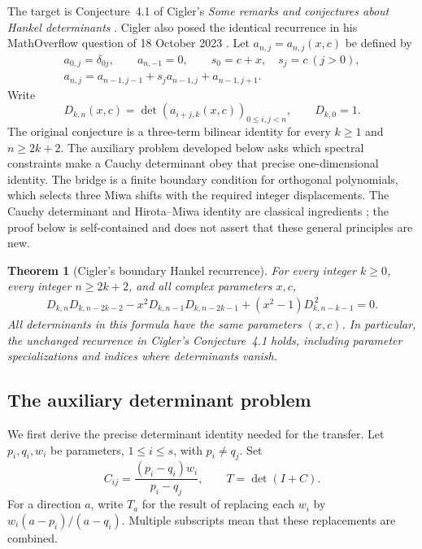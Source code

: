 \documentclass[11pt,a4paper]{article}
\newtheorem{theorem}{Theorem}[section]
\theoremstyle{definition}\newtheorem{definition}[theorem]{Definition}
\theoremstyle{remark}\newtheorem{remark}[theorem]{Remark}
\begin{document}
The target is Conjecture~4.1 of Cigler's
\emph{Some remarks and conjectures about Hankel determinants}
\cite{CiglerRemarks}. Cigler also posed the identical recurrence in his
MathOverflow question of 18 October 2023 \cite{CiglerMO23}.
Let $a_{n,j}=a_{n,j}(x,c)$ be defined by
\begin{gather*}
 a_{0,j}=\delta_{0j},\qquad a_{n,-1}=0,\qquad
 s_0=c+x,\quad s_j=c\ (j>0),\\
 a_{n,j}=a_{n-1,j-1}+s_j a_{n-1,j}+a_{n-1,j+1}.
\end{gather*}
Write
\[
 D_{k,n}(x,c)=\det(a_{i+j,k}(x,c))_{0\leq i,j<n},
 \qquad D_{k,0}=1.
\]
The original conjecture is a three-term bilinear identity for every
$k\geq1$ and $n\geq2k+2$. The auxiliary problem developed below asks
which spectral constraints make a Cauchy determinant obey that precise
one-dimensional identity. The bridge is a finite boundary condition for
orthogonal polynomials, which selects three Miwa shifts with the required
integer displacements. The Cauchy determinant and Hirota--Miwa identity
are classical ingredients \cite{OhtaHirotaTsujimotoImai93}; the proof below
is self-contained and does not assert that these general principles are new.

\begin{theorem}[Cigler's boundary Hankel recurrence]
\label{thm:cigler-boundary}
For every integer $k\geq0$, every integer $n\geq2k+2$, and all complex
parameters $x,c$,
\begin{align}
 D_{k,n}D_{k,n-2k-2}
 -x^2D_{k,n-1}D_{k,n-2k-1}
 +(x^2-1)D_{k,n-k-1}^{\,2}=0.
 \label{eq:cigler-target}
\end{align}
All determinants in this formula have the same parameters $(x,c)$.
In particular, the unchanged recurrence in Cigler's Conjecture~4.1 holds,
including parameter specializations and indices where determinants vanish.
\end{theorem}

\subsection{The auxiliary determinant problem}

We first derive the precise determinant identity needed for the transfer.
Let $p_i,q_i,w_i$ be parameters, $1\leq i\leq s$, with
$p_i\ne q_j$. Set
\[
 C_{ij}=\frac{(p_i-q_i)w_i}{p_i-q_j},\qquad T=\det(I+C).
\]
For a direction $a$, write $T_a$ for the result of replacing each $w_i$
by $w_i(a-p_i)/(a-q_i)$. Multiple subscripts mean that these replacements
are combined.
\end{document}
